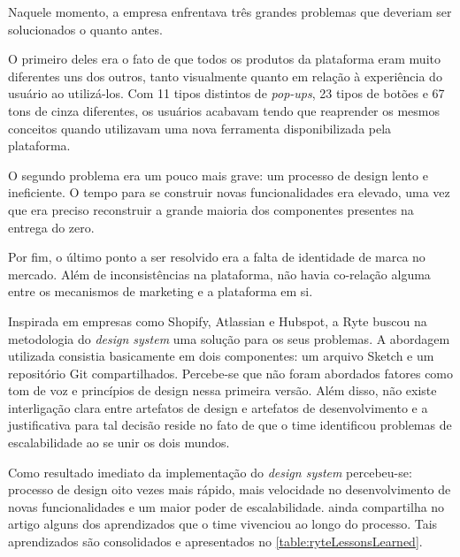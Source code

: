Naquele momento, a empresa enfrentava três grandes problemas que deveriam ser solucionados o quanto antes.

O primeiro deles era o fato de que todos os produtos da plataforma eram muito diferentes uns dos outros, tanto visualmente quanto em relação à experiência do usuário ao utilizá-los. Com 11 tipos distintos de \textit{pop-ups}, 23 tipos de botões e 67 tons de cinza diferentes, os usuários acabavam tendo que reaprender os mesmos conceitos quando utilizavam uma nova ferramenta disponibilizada pela plataforma.

O segundo problema era um pouco mais grave: um processo de design lento e ineficiente. O tempo para se construir novas funcionalidades era elevado, uma vez que era preciso reconstruir a grande maioria dos componentes presentes na entrega do zero.

Por fim, o último ponto a ser resolvido era a falta de identidade de marca no mercado. Além de inconsistências na plataforma, não havia co-relação alguma entre os mecanismos de marketing e a plataforma em si.

Inspirada em empresas como Shopify, Atlassian e Hubspot, a Ryte buscou na metodologia do \textit{design system} uma solução para os seus problemas. A abordagem utilizada consistia basicamente em dois componentes: um arquivo Sketch e um repositório Git compartilhados. Percebe-se que não foram abordados fatores como tom de voz e princípios de design nessa primeira versão. Além disso, não existe interligação clara entre artefatos de design e artefatos de desenvolvimento e a justificativa para tal decisão reside no fato de que o time identificou problemas de escalabilidade ao se unir os dois mundos.

Como resultado imediato da implementação do \textit{design system} percebeu-se: processo de design oito vezes mais rápido, mais velocidade no desenvolvimento de novas funcionalidades e um maior poder de escalabilidade.  ainda compartilha no artigo alguns dos aprendizados que o time vivenciou ao longo do processo. Tais aprendizados são consolidados e apresentados no \autoref{table:ryteLessonsLearned}.

